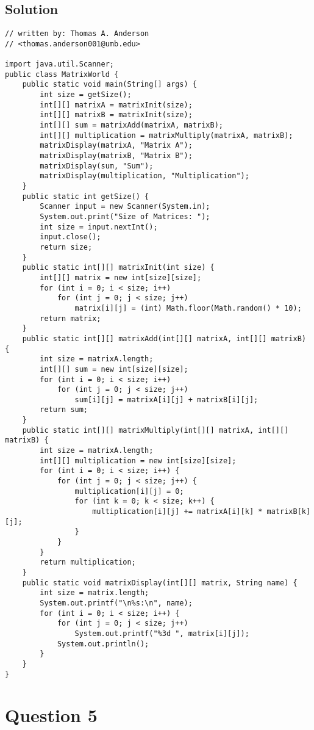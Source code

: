 \documentclass[12pt,letterpaper,twoside]{article}
\begin{document}
\subsection*{Solution}

\lstset{language=Java,tabsize=4}
\begin{lstlisting}
// written by: Thomas A. Anderson
// <thomas.anderson001@umb.edu>

import java.util.Scanner;
public class MatrixWorld {
	public static void main(String[] args) {
		int size = getSize();
		int[][] matrixA = matrixInit(size);
		int[][] matrixB = matrixInit(size);
		int[][] sum = matrixAdd(matrixA, matrixB);
		int[][] multiplication = matrixMultiply(matrixA, matrixB);
		matrixDisplay(matrixA, "Matrix A");
		matrixDisplay(matrixB, "Matrix B");
		matrixDisplay(sum, "Sum");
		matrixDisplay(multiplication, "Multiplication");
	}
	public static int getSize() {
		Scanner input = new Scanner(System.in);
		System.out.print("Size of Matrices: ");
		int size = input.nextInt();
		input.close();
		return size;
	}
	public static int[][] matrixInit(int size) {
		int[][] matrix = new int[size][size];
		for (int i = 0; i < size; i++)
			for (int j = 0; j < size; j++)
				matrix[i][j] = (int) Math.floor(Math.random() * 10);
		return matrix;
	}
	public static int[][] matrixAdd(int[][] matrixA, int[][] matrixB) {
		int size = matrixA.length;
		int[][] sum = new int[size][size];
		for (int i = 0; i < size; i++)
			for (int j = 0; j < size; j++)
				sum[i][j] = matrixA[i][j] + matrixB[i][j];
		return sum;
	}
	public static int[][] matrixMultiply(int[][] matrixA, int[][] matrixB) {
		int size = matrixA.length;
		int[][] multiplication = new int[size][size];
		for (int i = 0; i < size; i++) {
			for (int j = 0; j < size; j++) {
				multiplication[i][j] = 0;
				for (int k = 0; k < size; k++) {
					multiplication[i][j] += matrixA[i][k] * matrixB[k][j];
				}
			}
		}
		return multiplication;
	}
	public static void matrixDisplay(int[][] matrix, String name) {
		int size = matrix.length;
		System.out.printf("\n%s:\n", name);
		for (int i = 0; i < size; i++) {
			for (int j = 0; j < size; j++)
				System.out.printf("%3d ", matrix[i][j]);
			System.out.println();
		}
	}
}
\end{lstlisting}

\newpage

\section*{Question 5}
\end{document}
